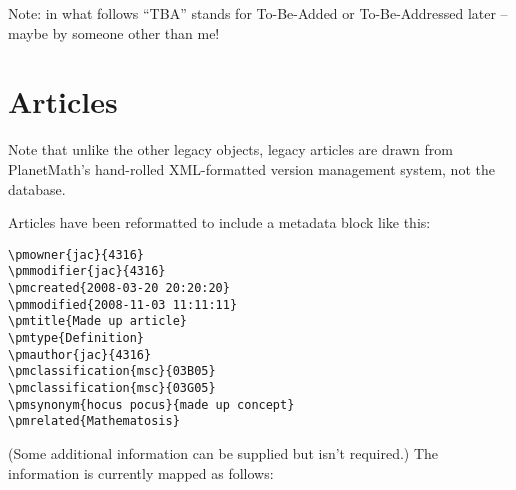 \documentclass{article}
\begin{document}
\bigskip

Note: in what follows ``TBA'' stands for To-Be-Added or
To-Be-Addressed later -- maybe by someone other than me!

\section{Articles}


Note that unlike the other legacy objects, legacy articles
are drawn from PlanetMath's hand-rolled XML-formatted
version management system, not the database.

Articles have been reformatted to include a metadata block
like this:

\begin{verbatim}
\pmowner{jac}{4316}
\pmmodifier{jac}{4316}
\pmcreated{2008-03-20 20:20:20}
\pmmodified{2008-11-03 11:11:11}
\pmtitle{Made up article}
\pmtype{Definition}
\pmauthor{jac}{4316}
\pmclassification{msc}{03B05}
\pmclassification{msc}{03G05}
\pmsynonym{hocus pocus}{made up concept}
\pmrelated{Mathematosis}
\end{verbatim}
(Some additional information can be supplied but isn't
required.)  The information is currently mapped as
follows:
\end{document}
